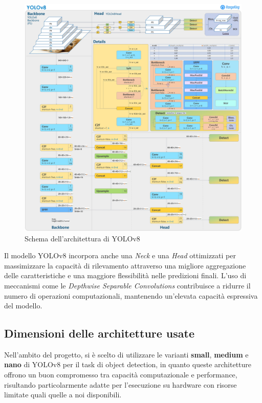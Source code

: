 \begin{figure}[h!]
    \centering
    \includegraphics[width=\textwidth]{yolov8_architecture.jpg}
    \caption{Schema dell'architettura di YOLOv8}
    \label{fig:2}
\end{figure}

Il modello YOLOv8 incorpora anche una \textit{Neck} e una \textit{Head} ottimizzati per massimizzare la capacità di rilevamento attraverso una migliore aggregazione delle caratteristiche e una maggiore flessibilità nelle predizioni finali. L'uso di meccanismi come le \textit{Depthwise Separable Convolutions} contribuisce a ridurre il numero di operazioni computazionali, mantenendo un'elevata capacità espressiva del modello.

\subsection*{Dimensioni delle architetture usate}

Nell'ambito del progetto, si è scelto di utilizzare le varianti \textbf{small}, \textbf{medium} e \textbf{nano} di YOLOv8 per il task di object detection, in quanto queste architetture offrono un buon compromesso tra capacità computazionale e performance, risultando particolarmente adatte per l'esecuzione su hardware con risorse limitate quali quelle a noi disponibili.

